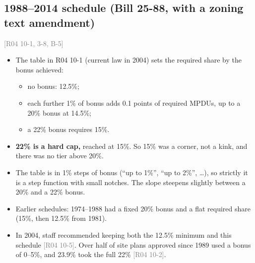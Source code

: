 \documentclass[11pt]{article}
\newcommand{\src}[1]{\textcolor{gray}{\small[#1]}}
\begin{document}
\subsection*{1988--2014 schedule (Bill 25-88, with a zoning text amendment)}
\src{R04 10-1, 3-8, B-5}
\begin{itemize}
  \item The table in R04 10-1 (current law in 2004) sets the required share by the bonus achieved:
    \begin{itemize}
      \item no bonus: 12.5\%;
      \item each further 1\% of bonus adds 0.1 points of required MPDUs, up to a 20\% bonus at 14.5\%;
      \item a 22\% bonus requires 15\%.
    \end{itemize}
  \item \textbf{22\% is a hard cap,} reached at 15\%. So 15\% was a corner, not a kink, and there was no tier above 20\%.
  \item The table is in 1\% steps of bonus (``up to 1\%'', ``up to 2\%'', \dots), so strictly it is a step function with small notches. The slope steepens slightly between a 20\% and a 22\% bonus.
  \item Earlier schedules: 1974--1988 had a fixed 20\% bonus and a flat required share (15\%, then 12.5\% from 1981).
  \item In 2004, staff recommended keeping both the 12.5\% minimum and this schedule \src{R04 10-5}. Over half of site plans approved since 1989 used a bonus of 0--5\%, and 23.9\% took the full 22\% \src{R04 10-2}.
\end{itemize}
\end{document}
